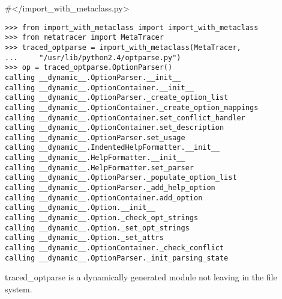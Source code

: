 \documentclass[10pt,a4paper,english]{article}
\begin{document}
{\#}{\textless}/import{\_}with{\_}metaclass.py{\textgreater}
\begin{verbatim}>>> from import_with_metaclass import import_with_metaclass
>>> from metatracer import MetaTracer
>>> traced_optparse = import_with_metaclass(MetaTracer, 
...     "/usr/lib/python2.4/optparse.py")
>>> op = traced_optparse.OptionParser()
calling __dynamic__.OptionParser.__init__
calling __dynamic__.OptionContainer.__init__
calling __dynamic__.OptionParser._create_option_list
calling __dynamic__.OptionContainer._create_option_mappings
calling __dynamic__.OptionContainer.set_conflict_handler
calling __dynamic__.OptionContainer.set_description
calling __dynamic__.OptionParser.set_usage
calling __dynamic__.IndentedHelpFormatter.__init__
calling __dynamic__.HelpFormatter.__init__
calling __dynamic__.HelpFormatter.set_parser
calling __dynamic__.OptionParser._populate_option_list
calling __dynamic__.OptionParser._add_help_option
calling __dynamic__.OptionContainer.add_option
calling __dynamic__.Option.__init__
calling __dynamic__.Option._check_opt_strings
calling __dynamic__.Option._set_opt_strings
calling __dynamic__.Option._set_attrs
calling __dynamic__.OptionContainer._check_conflict
calling __dynamic__.OptionParser._init_parsing_state\end{verbatim}

traced{\_}optparse is a dynamically generated module not leaving in the
file system.



\hypertarget{magic-properties}{}
\end{document}
